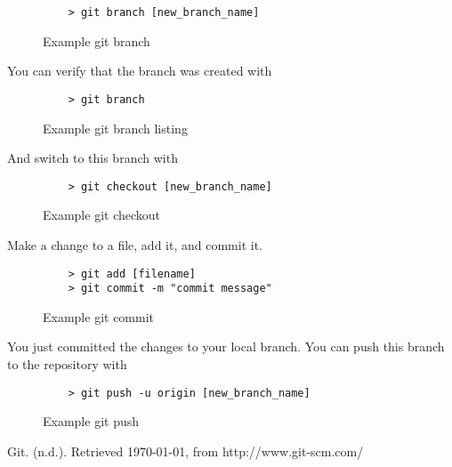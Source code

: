 \documentclass[11pt]{report}
\begin{document}
\begin{figure}[H]
  \caption{Example git branch}
  \begin{lstlisting}
    > git branch [new_branch_name]
  \end{lstlisting}
\end{figure}

You can verify that the branch was created with

\begin{figure}[H]
  \caption{Example git branch listing}
  \begin{lstlisting}
    > git branch
  \end{lstlisting}
\end{figure}

And switch to this branch with

\begin{figure}[H]
  \caption{Example git checkout}
  \begin{lstlisting}
    > git checkout [new_branch_name]
  \end{lstlisting}
\end{figure}

Make a change to a file, add it, and commit it.

\begin{figure}[H]
  \caption{Example git commit}
  \begin{lstlisting}
    > git add [filename]
    > git commit -m "commit message"
    \end{lstlisting}
\end{figure}

You just committed the changes to your local branch.  You can push
this branch to the repository with

\begin{figure}[H]
  \caption{Example git push}
  \begin{lstlisting}
    > git push -u origin [new_branch_name]
  \end{lstlisting}
\end{figure}

\begin{thebibliography}{9}

    Git. (n.d.). Retrieved \today, from http://www.git-scm.com/

\end{thebibliography}
\end{document}
